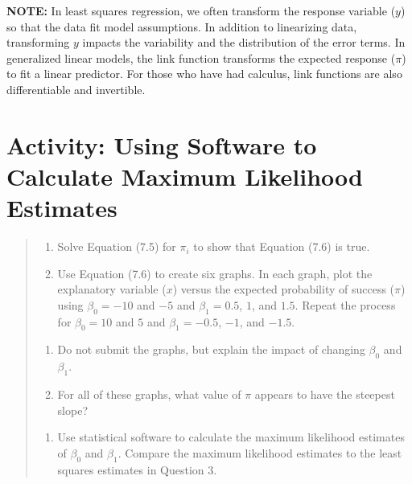 \documentclass[
]{report}
\providecommand{\tightlist}{%
  \setlength{\itemsep}{0pt}\setlength{\parskip}{0pt}}
\begin{document}
\large

\textbf{NOTE:} In least squares regression, we often transform the response variable (\(y\)) so that the data fit model assumptions. In addition to linearizing data, transforming \(y\) impacts the variability and the distribution of the error terms. In generalized linear models, the link function transforms the expected response (\(\pi\)) to fit a linear predictor. For those who have had calculus, link functions are also differentiable and invertible.
\normalsize

\section*{Activity: Using Software to Calculate Maximum Likelihood Estimates}\label{activity-using-software-to-calculate-maximum-likelihood-estimates}

\begin{quote}
\begin{enumerate}
\def\labelenumi{\arabic{enumi}.}
\setcounter{enumi}{3}
\tightlist
\item
  Solve Equation (7.5) for \(\pi_i\) to show that Equation (7.6) is true.\\
\item
  Use Equation (7.6) to create six graphs. In each graph, plot the explanatory variable (\(x\)) versus the expected probability of success (\(\pi\)) using \(\beta_0 = -10\) and \(-5\) and \(\beta_1 = 0.5\), \(1\), and \(1.5\). Repeat the process for \(\beta_0 = 10\) and \(5\) and \(\beta_1 = -0.5\), \(-1\), and \(-1.5\).\\
\end{enumerate}

\begin{enumerate}
\def\labelenumi{\alph{enumi}.}
\tightlist
\item
  Do not submit the graphs, but explain the impact of changing \(\beta_0\) and \(\beta_1\).\\
\item
  For all of these graphs, what value of \(\pi\) appears to have the steepest slope?\\
\end{enumerate}

\begin{enumerate}
\def\labelenumi{\arabic{enumi}.}
\setcounter{enumi}{5}
\tightlist
\item
  Use statistical software to calculate the maximum likelihood estimates of \(\beta_0\) and \(\beta_1\). Compare the maximum likelihood estimates to the least squares estimates in Question 3.
\end{enumerate}
\end{quote}
\end{document}

